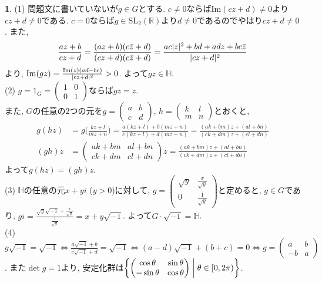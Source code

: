 \documentclass{amsart}
\theoremstyle{definition}
\newtheorem{ans}{}
\numberwithin{ans}{subsection}
\DeclarePairedDelimiter{\abs}{\lvert}{\rvert}
\begin{document}
\begin{ans}
  (1) 問題文に書いていないが$g \in G$とする.
  $c \neq 0$ならば$\mathrm{Im}(cz + d) \neq 0$より$cz + d \neq 0$である.
  $c = 0$ならば$g \in \mathrm{SL}_2(\mathbb{R})$より$d \neq 0$であるのでやはり$cz + d \neq 0$.
  また,
  \begin{align*}
    \frac{az + b}{cz + d}
    = \frac{(az + b)(c\bar{z} + d)}{(cz + d)(c\bar{z} + d)}
    = \frac{ac\abs{z}^2 + bd + adz + bc\bar{z}}{\abs{cz + d}^2}
  \end{align*}
  より, $\mathrm{Im}(gz) = \frac{\mathrm{Im}(z)(ad - bc)}{\abs{cz + d}^2} > 0$.
  よって$gz \in \mathbb{H}$.\\
  (2) $g = 1_G = \begin{pmatrix*}
    1 & 0 \\
    0 & 1
  \end{pmatrix*}$ならば$gz = z$.\\
  また, $G$の任意の$2$つの元を$g = \begin{pmatrix*}
    a & b \\
    c & d
  \end{pmatrix*}$, $h = \begin{pmatrix*}
    k & l \\
    m & n
  \end{pmatrix*}$とおくと,
  \begin{align*}
    g(hz) &= g\biggl(\frac{kz + l}{mz + n}\biggr)
    = \frac{a(kz + l) + b(mz + n)}{c(kz + l) + d(mz + n)}
    = \frac{(ak + bm)z + (al + bn)}{(ck + dm)z + (cl + dn)}\\
    (gh)z &= \begin{pmatrix*}
      ak + bm & al + bn \\
      ck + dm & cl + dn
    \end{pmatrix*}z = \frac{(ak + bm)z + (al + bn)}{(ck + dm)z + (cl + dn)}
  \end{align*}
  よって$g(hz) = (gh)z$.\\
  (3) $\mathbb{H}$の任意の元$x + yi$ ($y > 0$)に対して,
  $g = \begin{pmatrix*}
    \sqrt{y} & \frac{x}{\sqrt{y}} \\
    0 & \frac{1}{\sqrt{y}}
  \end{pmatrix*}$と定めると, $g \in G$であり,
  $gi = \frac{\sqrt{y} \sqrt{-1} + \frac{x}{\sqrt{y}}}{\frac{1}{\sqrt{y}}} = x + y\sqrt{-1}$.
  よって$G \cdot \sqrt{-1} = \mathbb{H}$.\\
  (4) $g \sqrt{-1} = \sqrt{-1}
  \Leftrightarrow \frac{a\sqrt{-1} + b}{c\sqrt{-1} + d} = \sqrt{-1}
  \Leftrightarrow (a - d)\sqrt{-1} + (b + c) = 0
  \Leftrightarrow g = \begin{pmatrix*}
    a & b \\
    -b & a
  \end{pmatrix*}$.
  また$\det g = 1$より, 安定化群は$\biggl\{\begin{pmatrix*}
    \cos\theta & \sin\theta \\
    -\sin\theta & \cos\theta
  \end{pmatrix*} \biggm\vert \theta \in [0, 2\pi) \biggr\}$.
\end{ans}
\end{document}
